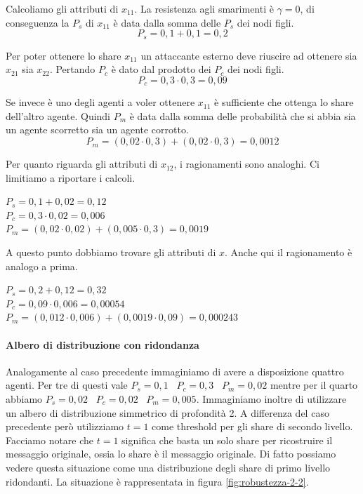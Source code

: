 Calcoliamo gli attributi di $ x_{11} $. La resistenza agli smarimenti è $ \gamma = 0 $,
di conseguenza la $ P_s $ di $ x_{11} $ è data dalla somma delle $ P_s $ dei nodi figli.
$$ P_s = 0,1 + 0,1 = 0,2 $$

Per poter ottenere lo share $ x_{11} $ un attaccante esterno deve riuscire ad ottenere
sia $ x_{21} $ sia $ x_{22} $. Pertando $ P_c $ è dato dal prodotto dei $ P_c $ dei nodi figli.
$$ P_c = 0,3 \cdot 0,3 = 0,09 $$

Se invece è uno degli agenti a voler ottenere $ x_{11} $  è sufficiente che ottenga
lo share dell'altro agente. Quindi $ P_m $ è data dalla somma delle probabilità
che si abbia sia un agente scorretto sia un agente corrotto.
$$ P_m = (0,02 \cdot 0,3) + (0,02 \cdot 0,3) = 0,0012 $$

Per quanto riguarda gli attributi di $ x_{12} $, i ragionamenti sono analoghi. Ci limitiamo
a riportare i calcoli.
\begin{tightcenter}
	$ P_s = 0,1 + 0,02 = 0,12 $      \\
	$ P_c = 0,3 \cdot 0,02 = 0,006 $ \\
	$ P_m = (0,02 \cdot 0,02) + (0,005 \cdot 0,3) = 0,0019 $
\end{tightcenter}
A questo punto dobbiamo trovare gli attributi di $ x $.
Anche qui il ragionamento è analogo a prima.
\begin{tightcenter}
	$ P_s = 0,2 + 0,12 = 0,32 $\\
	$ P_c = 0,09 \cdot 0,006 = 0,00054 $\\
	$ P_m = (0,012 \cdot 0,006) + (0,0019 \cdot 0,09) = 0,000243 $
\end{tightcenter}
\paragraph{Albero di distribuzione con ridondanza}
Analogamente al caso precedente immaginiamo di avere a disposizione quattro agenti. Per tre di questi
vale
$ P_s = 0,1 $ \,
$ P_c = 0,3 $ \,
$ P_m = 0,02 $
mentre per il quarto abbiamo
$ P_s = 0,02 $ \,
$ P_c = 0,02 $ \,
$ P_m = 0,005 $.
Immaginiamo inoltre di utilizzare un albero di distribuzione simmetrico di profondità 2.
A differenza del caso precedente però utilizziamo $ t = 1 $ come threshold per gli share di secondo livello.
Facciamo notare che $ t = 1 $ significa che basta un solo share per ricostruire il messaggio originale,
ossia lo share è il messaggio originale. Di fatto possiamo vedere questa situazione come una
distribuzione degli share di primo livello ridondanti.
La situazione è rappresentata in figura \ref{fig:robustezza-2-2}.

